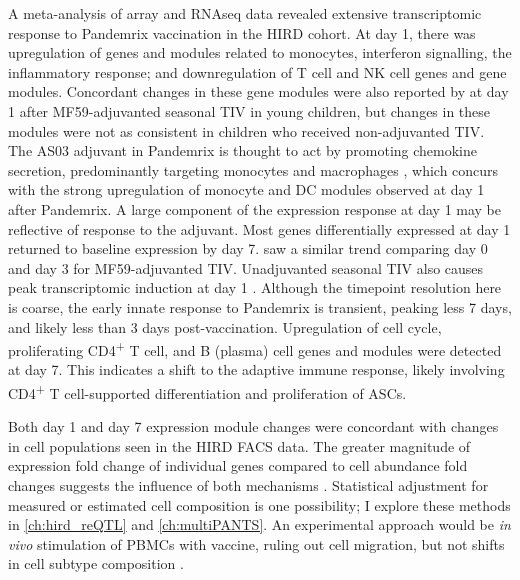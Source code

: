 A meta-analysis of array and \gls{RNAseq} data revealed extensive transcriptomic response to Pandemrix vaccination in the \gls{HIRD} cohort.
%
At day 1, there was
upregulation of genes and modules related to monocytes, interferon signalling, the inflammatory response;
and downregulation of T cell and \gls{NK} cell genes and gene modules.
Concordant changes in these gene modules were also reported by \textcite{nakaya2016SystemsBiologyImmunity} at day 1 after MF59-adjuvanted seasonal \gls{TIV} in young children, but changes in these modules were not as consistent in children who received non-adjuvanted \gls{TIV}.
The AS03 adjuvant in Pandemrix is thought to act by promoting chemokine secretion, predominantly targeting monocytes and macrophages \autocite{morel2011AdjuvantSystemAS03,wilkins2017AS03MF59AdjuvantedInfluenza}, which concurs with the strong upregulation of monocyte and \gls{DC} modules observed at day 1 after Pandemrix.
A large component of the expression response at day 1 may be reflective of response to the adjuvant.
%
Most genes differentially expressed at day 1 returned to baseline expression by day 7.
\textcite{nakaya2016SystemsBiologyImmunity} saw a similar trend comparing day 0 and day 3 for MF59-adjuvanted \gls{TIV}.
Unadjuvanted seasonal \gls{TIV} also causes peak transcriptomic induction at day 1 \textcite{bucasas2011EarlyPatternsGene}.
Although the timepoint resolution here is coarse,
the early innate response to Pandemrix is transient, peaking less 7 days, and likely less than 3 days post-vaccination.
%
Upregulation of cell cycle, proliferating CD4\textsuperscript{+} T cell, and B (plasma) cell genes and modules were detected at day 7.
This indicates a shift to the adaptive immune response, likely involving CD4\textsuperscript{+} T cell-supported differentiation and proliferation of \glspl{ASC}.

Both day 1 and day 7 expression module changes were concordant with changes in cell populations seen in the \gls{HIRD} \gls{FACS} data.
The greater magnitude of expression fold change of individual genes compared to cell abundance fold changes suggests the influence of both mechanisms \autocite{sobolev2016AdjuvantedInfluenzaH1N1Vaccination}.
Statistical adjustment for measured or estimated cell composition is one possibility; I explore these methods in \cref{ch:hird_reQTL} and \cref{ch:multiPANTS}.
An experimental approach would be \textit{in vivo} stimulation of \glspl{PBMC} with vaccine, ruling out cell migration, but not shifts in cell subtype composition \autocite{querec2009SystemsBiologyApproach}.

